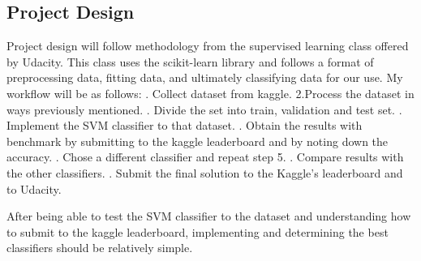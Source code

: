 \documentclass{article}
\begin{document}
\subsection{Project Design}
Project design will follow methodology from the supervised learning class offered by Udacity. This class uses the scikit-learn library and follows a format of preprocessing data, fitting data, and ultimately classifying data for our use. \newline My workflow will be as follows:
\newline{}. Collect dataset from kaggle.
\newline\newline
2.Process the dataset in ways previously mentioned.
\newline{}. Divide the set into train, validation and test set.
\newline{}. Implement the SVM classifier to that dataset.
\newline{}. Obtain the results with benchmark by submitting to the kaggle leaderboard and by noting down the accuracy.
\newline{}. Chose a different classifier and repeat step 5.
\newline{}. Compare results with the other classifiers.
\newline{}. Submit the final solution to the Kaggle's leaderboard and to Udacity.
\newline\newline

After being able to test the SVM classifier to the dataset and understanding how to submit to the kaggle leaderboard, implementing and determining the best classifiers should be relatively simple. 
\end{document}
